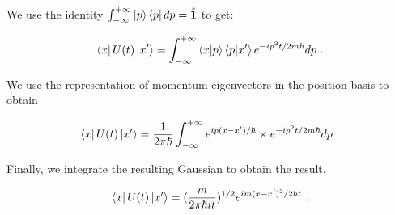 

We use the identity $\int_{-\infty}^{+\infty} \ket{p}\bra{p} dp = \hat{\textbf{1}}$ to get:

\begin{equation}
   \bra{x} U(t) \ket{x'} = \int_{-\infty}^{+\infty} \braket{x}{p}\braket{p}{x'} e^{-ip^2t/2m\hbar} dp~.
\end{equation}

We use the representation of momentum eigenvectors in the position basis to obtain

\begin{equation}
    \bra{x} U(t) \ket{x'} = \frac{1}{2 \pi \hbar} \int_{-\infty}^{+\infty} e^{ip(x-x')/\hbar} \times e^{-ip^2t/2m\hbar} dp~.
\end{equation}

Finally, we integrate the resulting Gaussian to obtain the result,

\begin{equation}
    \bra{x} U(t) \ket{x'} = (\frac{m}{2 \pi \hbar i t})^{1/2} e^{im(x-x')^2/2 \hbar t}~.
\end{equation}
